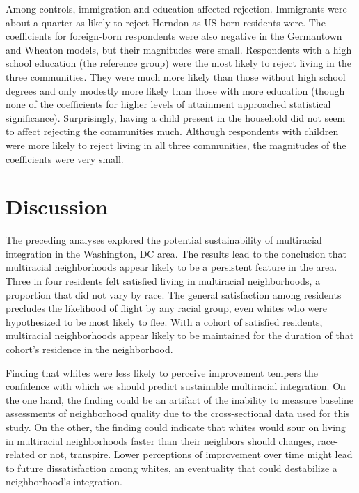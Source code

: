 \documentclass{baderart}
\begin{document}

Among controls, immigration and education affected rejection. Immigrants were about a quarter as likely to reject Herndon as US-born residents were. The coefficients for foreign-born respondents were also negative in the Germantown and Wheaton models, but their magnitudes were small. Respondents with a high school education (the reference group) were the most likely to reject living in the three communities. They were much more likely than those without high school degrees and only modestly more likely than those with more education (though none of the coefficients for higher levels of attainment approached statistical significance). Surprisingly, having a child present in the household did not seem to affect rejecting the communities much. Although respondents with children were more likely to reject living in all three communities, the magnitudes of the coefficients were very small.  

\section{Discussion}
The preceding analyses explored the potential sustainability of multiracial integration in the Washington, DC area. The results lead to the conclusion that multiracial neighborhoods appear likely to be a persistent feature in the area. Three in four residents felt satisfied living in multiracial neighborhoods, a proportion that did not vary by race. The general satisfaction among residents precludes the likelihood of flight by any racial group, even whites who were hypothesized to be most likely to flee. With a cohort of satisfied residents, multiracial neighborhoods appear likely to be maintained for the duration of that cohort's residence in the neighborhood.

Finding that whites were less likely to perceive improvement tempers the confidence with which we should predict sustainable multiracial integration. On the one hand, the finding could be an artifact of the inability to measure baseline assessments of neighborhood quality due to the cross-sectional data used for this study. On the other, the finding could indicate that whites would sour on living in multiracial neighborhoods faster than their neighbors should changes, race-related or not, transpire. Lower perceptions of improvement over time might lead to future dissatisfaction among whites, an eventuality that could destabilize a neighborhood's integration.
\end{document}
